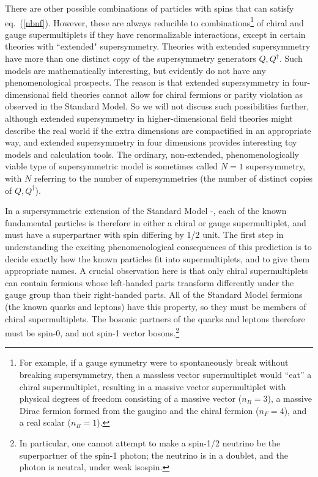 \documentclass[11pt]{article}
\newcommand{\dagg}[1]{#1^\dagger}
\begin{document}
There are other possible combinations of particles with spins that can 
satisfy eq.~(\ref{nbnf}). However, these are always reducible to 
combinations\footnote{For example, if a gauge symmetry were to 
spontaneously break without breaking supersymmetry, then a massless vector 
supermultiplet would ``eat'' a chiral supermultiplet, resulting in a 
massive vector supermultiplet with physical degrees of freedom consisting 
of a massive vector ($n_B=3$), a massive Dirac fermion formed from the 
gaugino and the chiral fermion ($n_F=4$), and a real scalar ($n_B=1$).} of 
chiral and gauge supermultiplets if they have renormalizable interactions, 
except in certain theories with ``extended" supersymmetry. Theories with 
extended supersymmetry have more than one distinct copy of the 
supersymmetry generators $Q,\dagg{Q}$. Such models are mathematically 
interesting, but evidently do not have any phenomenological prospects. The 
reason is that extended supersymmetry in four-dimensional field theories 
cannot allow for chiral fermions or parity violation as observed in the 
Standard Model. So we will not discuss such possibilities further, 
although extended supersymmetry in higher-dimensional field theories might 
describe the real world if the extra dimensions are compactified in an 
appropriate way, and extended supersymmetry in four dimensions provides 
interesting toy models and calculation tools. 
The ordinary, non-extended, phenomenologically 
viable type of supersymmetric model is sometimes called $N=1$ 
supersymmetry, with $N$ referring to the number of supersymmetries (the 
number of distinct copies of $Q, \dagg{Q}$).

In a supersymmetric extension of the Standard Model 
\cite{FayetHsnu}-\cite{Rparity}, 
each of the known fundamental 
particles is therefore in either a chiral or gauge supermultiplet, and 
must have a superpartner with spin differing by 1/2 unit. The first step 
in understanding the exciting phenomenological consequences of this 
prediction is to decide exactly how the known particles fit into 
supermultiplets, and to give them appropriate names. A crucial observation 
here is that only chiral supermultiplets can contain fermions whose 
left-handed parts transform differently under the gauge group than their 
right-handed parts. All of the Standard Model fermions (the known quarks 
and leptons) have this property, so they must be members of chiral 
supermultiplets. The bosonic partners of the quarks and leptons therefore must
be spin-0, and not spin-1 vector bosons.\footnote{In particular, one cannot attempt to make a 
spin-1/2 neutrino be the superpartner of the spin-1 photon; the neutrino 
is in a doublet, and the photon is neutral, under weak isospin.} 
\end{document}

